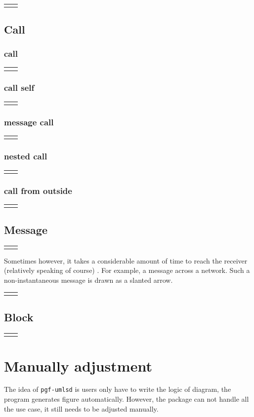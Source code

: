 \documentclass{article}
\newcommand{\demo}[2][1]{
  \begin{center}
  \begin{tabular}{cc}
    \begin{minipage}{.49\linewidth}
      \centering
      \resizebox{#1\linewidth}{!}{
        
      }
    \end{minipage}
    &
    \begin{minipage}{.45\linewidth}
      
    \end{minipage}
  \end{tabular}
  \end{center}
}
\begin{document}
\demo{customize}


\subsection{Call}
\subsubsection{call}
\demo[0.6]{call}

\subsubsection{call self}
\demo[0.6]{callself}

\subsubsection{message call}
\demo[0.6]{messcall}

\subsubsection{nested call}
\demo[0.6]{nested-call}

\subsubsection{call from outside}
\demo[0.6]{call-from-outside}

\subsection{Message}
\demo[0.6]{message}

Sometimes however, it takes a considerable amount of time to reach the
receiver (relatively speaking of course) . For example, a message
across a network. Such a non-instantaneous message is drawn as a
slanted arrow.

\demo[0.6]{non-instantaneous-message}

\subsection{Block}
\demo[0.6]{block}

\section{Manually adjustment}
The idea of \texttt{pgf-umlsd} is users only have to write the logic
of diagram, the program generates figure automatically. However, the
package can not handle all the use case, it still needs to be adjusted
manually.
\end{document}

